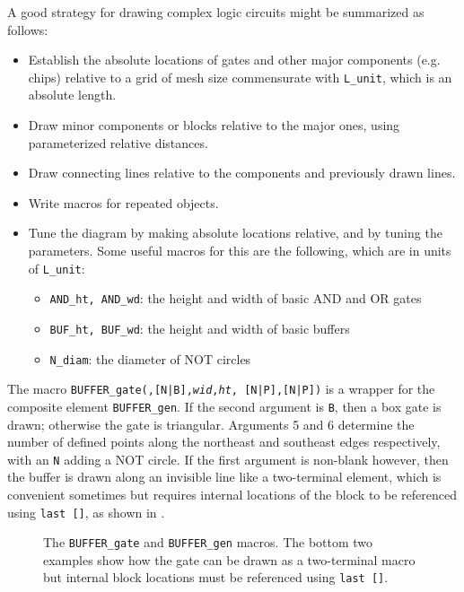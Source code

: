 A good strategy for drawing complex logic circuits might be summarized
as follows:
\begin{itemize}\itemsep=0pt
\item Establish the absolute locations of gates and other major components
  (e.g. chips) relative to a grid of mesh size commensurate with
  {\tt L\_unit}, which is an absolute length.
\item Draw minor components or blocks relative to the major ones, using
   parameterized relative distances.
\item Draw connecting lines relative to the components and previously drawn
   lines.
\item Write macros for repeated objects.
\item Tune the diagram by making absolute locations relative, and by tuning
   the parameters.
   Some useful macros for this are the following, which are in units of
  {\tt L\_unit}:
   \begin{itemize}
   \item[] {\tt AND\_ht, AND\_wd}: the height and width of basic AND and
     OR gates
   \item[] {\tt BUF\_ht, BUF\_wd}: the height and width of basic buffers
   \item[] {\tt N\_diam}: the diameter of NOT circles
   \end{itemize}
   \end{itemize}

The macro {\tt BUFFER\_gate(\linespec,[N|B],{\sl wid},{\sl ht},%
 [N|P],[N|P])}
is a wrapper for the composite element {\tt BUFFER\_gen}.
If the second argument is {\tt B}, then a box gate is drawn; otherwise
the gate is triangular.  Arguments 5 and 6 determine the number of defined
points along the northeast and southeast edges respectively, with an {\tt N}
adding a NOT circle.
If the first argument is non-blank however, then the buffer is drawn along
an invisible line like a two-terminal element, which is convenient sometimes
but requires internal locations of the block to be referenced using
{\tt last []}, as shown in .
\begin{figure}[H]
   \vspace*{-\baselineskip}
   
   \caption{The {\tt BUFFER\_gate} and {\tt BUFFER\_gen} macros.
     The bottom two examples show how the gate can be drawn as a two-terminal
     macro but internal block locations must be referenced using
     {\tt last []}.}
   \label{Buffer}
   \end{figure}

